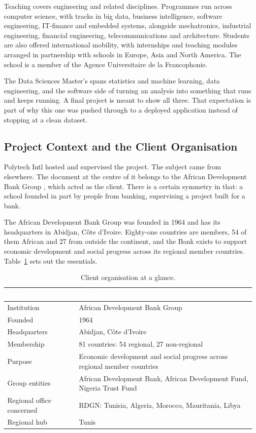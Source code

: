 Teaching covers engineering and related disciplines. Programmes run across
computer science, with tracks in big data, business intelligence, software
engineering, IT-finance and embedded systems, alongside mechatronics, industrial
engineering, financial engineering, telecommunications and architecture.
Students are also offered international mobility, with internships and teaching
modules arranged in partnership with schools in Europe, Asia and North America.
The school is a member of the Agence Universitaire de la Francophonie.

The Data Sciences Master's spans statistics and machine learning, data
engineering, and the software side of turning an analysis into something that
runs and keeps running. A final project is meant to show all three. That
expectation is part of why this one was pushed through to a deployed application
instead of stopping at a clean dataset.

\subsection{Project Context and the Client Organisation}

Polytech Intl hosted and supervised the project. The subject came from elsewhere.
The document at the centre of it belongs to the African Development Bank Group \citep{afdb},
which acted as the client. There is a certain symmetry in that: a school founded
in part by people from banking, supervising a project built for a bank.

The African Development Bank Group was founded in 1964 \citep{afdb} and has its headquarters
in Abidjan, C\^ote d'Ivoire. Eighty-one countries are members, 54 of them
African and 27 from outside the continent, and the Bank exists to support
economic development and social progress across its regional member countries.
Table~\ref{tab:afdb} sets out the essentials.

\begin{table}[h]
\centering
\caption{Client organisation at a glance.}
\label{tab:afdb}
\begin{tabular}{|p{}|p{}|}
\hline
\rowcolor{myblue}\textcolor{white}{\textbf{Item}} & \textcolor{white}{\textbf{Detail}} \\
\hline
Institution & African Development Bank Group \\ \hline
Founded & 1964 \\ \hline
Headquarters & Abidjan, C\^ote d'Ivoire \\ \hline
Membership & 81 countries: 54 regional, 27 non-regional \\ \hline
Purpose & Economic development and social progress across regional member countries \\ \hline
Group entities & African Development Bank, African Development Fund, Nigeria Trust Fund \\ \hline
Regional office concerned & RDGN: Tunisia, Algeria, Morocco, Mauritania, Libya \\ \hline
Regional hub & Tunis \\ \hline
\end{tabular}
\end{table}

